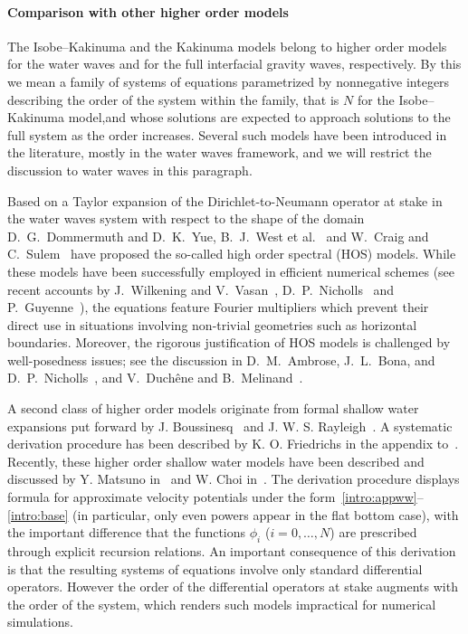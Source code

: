 \documentclass[11pt,leqno]{article}
\numberwithin{equation}{section}
\numberwithin{figure}{section}
\begin{document}
\paragraph{Comparison with other higher order models}
%
The Isobe--Kakinuma and the Kakinuma models belong to higher order models for the water waves and for the full interfacial gravity waves, respectively. 
By this we mean a family of systems of equations parametrized by nonnegative integers describing the order of the system within the family, 
that is $N$ for the Isobe--Kakinuma model,and whose solutions are expected to approach solutions to the full system as the order increases. 
Several such models have been introduced in the literature, mostly in the water waves framework, and we will restrict the discussion to water waves in this paragraph. 

Based on a Taylor expansion of the Dirichlet-to-Neumann operator at stake in the water waves system with respect to the shape of the domain D.~G.~Dommermuth and D.~K.~Yue\cite{DommermuthYue87}, B.~J.~West et al.~\cite{WestBruecknerJandaEtAl87} and W.~Craig and C.~Sulem~\cite{CraigSulem93} have proposed the so-called high order spectral (HOS) models. 
While these models have been successfully employed in efficient numerical schemes (see recent accounts by J.~Wilkening and V.~Vasan~\cite{WilkeningVasan15}, D.~P.~Nicholls~\cite{Nicholls16} and P.~Guyenne~\cite{Guyenne19}), the equations feature Fourier multipliers which prevent their direct use in situations involving non-trivial geometries such as horizontal boundaries. 
Moreover, the rigorous justification of HOS models is challenged by well-posedness issues; see the discussion in D.~M.~Ambrose, J.~L.~Bona, and D.~P.~Nicholls~\cite{AmbroseBonaNicholls14}, and V.~Duchêne and B.~Melinand~\cite{DucheneMelinand}. 

A second class of higher order models originate from formal shallow water expansions put forward by J. Boussinesq~\cite{Boussinesq73} and J. W. S. Rayleigh~\cite{Rayleigh76}. A systematic derivation procedure has been described by K. O. Friedrichs in the appendix to~\cite{Stoker48}. Recently, these higher order shallow water models have been described and discussed by Y. Matsuno in~\cite{Matsuno15,Matsuno16} and W. Choi in~\cite{Choi19,Choi22}. 
The derivation procedure displays formula for approximate velocity potentials under the form~\eqref{intro:appww}--\eqref{intro:base}  (in particular, only even powers appear in the flat bottom case), 
with the important difference that the functions $\phi_{i}$ ($i=0,\dots,N$) are prescribed through explicit recursion relations. An important consequence of this derivation is that the resulting systems of equations involve only standard differential operators. However the order of the differential operators at stake augments with the order of the system, which renders such models impractical for numerical simulations.
\end{document}
